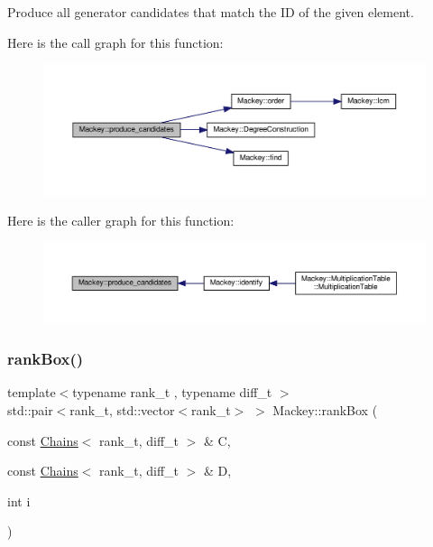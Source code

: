 Produce all generator candidates that match the ID of the given element. 

Here is the call graph for this function\+:\nopagebreak
\begin{figure}[H]
\begin{center}
\leavevmode
\includegraphics[width=350pt]{namespaceMackey_a417d303e187dac5a1a2c2c02c6267758_cgraph}
\end{center}
\end{figure}
Here is the caller graph for this function\+:\nopagebreak
\begin{figure}[H]
\begin{center}
\leavevmode
\includegraphics[width=350pt]{namespaceMackey_a417d303e187dac5a1a2c2c02c6267758_icgraph}
\end{center}
\end{figure}
\mbox{\label{namespaceMackey_a1257ce64369e72438023fd4e261c7c83}} 
\subsubsection{\texorpdfstring{rank\+Box()}{rankBox()}}
{\footnotesize\ttfamily template$<$typename rank\+\_\+t , typename diff\+\_\+t $>$ \\
std\+::pair$<$rank\+\_\+t, std\+::vector$<$rank\+\_\+t$>$ $>$ Mackey\+::rank\+Box (\begin{DoxyParamCaption}\item[{const \hyperlink{classMackey_1_1Chains}{Chains}$<$ rank\+\_\+t, diff\+\_\+t $>$ \&}]{C,  }\item[{const \hyperlink{classMackey_1_1Chains}{Chains}$<$ rank\+\_\+t, diff\+\_\+t $>$ \&}]{D,  }\item[{int}]{i }\end{DoxyParamCaption})}



